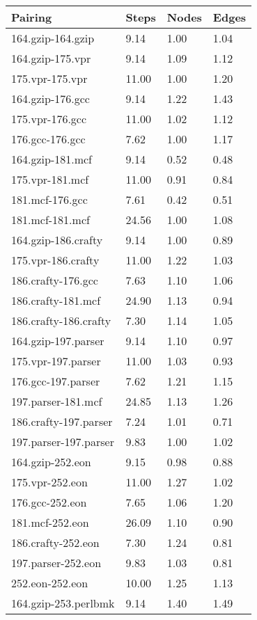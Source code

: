 \begin{table}
\centering
\tiny
\begin{tabular}{|l|l|l|l|}
\hline
Pairing&Steps&Nodes&Edges\\
\hline
\hline
164.gzip-164.gzip&9.14&1.00&1.04\\
\hline
164.gzip-175.vpr&9.14&1.09&1.12\\
\hline
175.vpr-175.vpr&11.00&1.00&1.20\\
\hline
164.gzip-176.gcc&9.14&1.22&1.43\\
\hline
175.vpr-176.gcc&11.00&1.02&1.12\\
\hline
176.gcc-176.gcc&7.62&1.00&1.17\\
\hline
164.gzip-181.mcf&9.14&0.52&0.48\\
\hline
175.vpr-181.mcf&11.00&0.91&0.84\\
\hline
181.mcf-176.gcc&7.61&0.42&0.51\\
\hline
181.mcf-181.mcf&24.56&1.00&1.08\\
\hline
164.gzip-186.crafty&9.14&1.00&0.89\\
\hline
175.vpr-186.crafty&11.00&1.22&1.03\\
\hline
186.crafty-176.gcc&7.63&1.10&1.06\\
\hline
186.crafty-181.mcf&24.90&1.13&0.94\\
\hline
186.crafty-186.crafty&7.30&1.14&1.05\\
\hline
164.gzip-197.parser&9.14&1.10&0.97\\
\hline
175.vpr-197.parser&11.00&1.03&0.93\\
\hline
176.gcc-197.parser&7.62&1.21&1.15\\
\hline
197.parser-181.mcf&24.85&1.13&1.26\\
\hline
186.crafty-197.parser&7.24&1.01&0.71\\
\hline
197.parser-197.parser&9.83&1.00&1.02\\
\hline
164.gzip-252.eon&9.15&0.98&0.88\\
\hline
175.vpr-252.eon&11.00&1.27&1.02\\
\hline
176.gcc-252.eon&7.65&1.06&1.20\\
\hline
181.mcf-252.eon&26.09&1.10&0.90\\
\hline
186.crafty-252.eon&7.30&1.24&0.81\\
\hline
197.parser-252.eon&9.83&1.03&0.81\\
\hline
252.eon-252.eon&10.00&1.25&1.13\\
\hline
164.gzip-253.perlbmk&9.14&1.40&1.49\\

\end{tabular}
\end{table}
